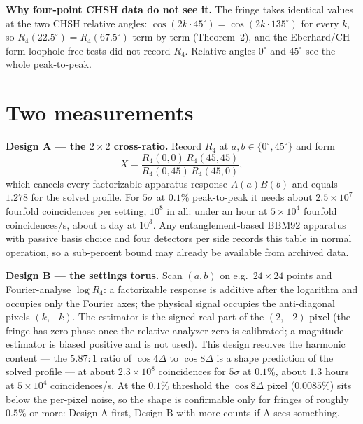 \documentclass[10pt]{article}
\begin{document}
\textbf{Why four-point CHSH data do not see it.} The fringe takes identical values at the two CHSH relative angles: $\cos(2k\cdot 45^\circ)=\cos(2k\cdot 135^\circ)$ for every $k$, so $R_4(22.5^\circ)=R_4(67.5^\circ)$ term by term (Theorem~2), and the Eberhard/CH-form loophole-free tests did not record $R_4$. Relative angles $0^\circ$ and $45^\circ$ see the whole peak-to-peak.

\section*{Two measurements}
\textbf{Design A --- the $2\times 2$ cross-ratio.} Record $R_4$ at $a,b\in\{0^\circ,45^\circ\}$ and form
\[
X=\frac{R_4(0,0)\,R_4(45,45)}{R_4(0,45)\,R_4(45,0)},
\]
which cancels every factorizable apparatus response $A(a)B(b)$ and equals $1.278$ for the solved profile. For $5\sigma$ at $0.1\%$ peak-to-peak it needs about $2.5\times 10^7$ fourfold coincidences per setting, $10^8$ in all: under an hour at $5\times 10^4$ fourfold coincidences/s, about a day at $10^3$. Any entanglement-based BBM92 apparatus with passive basis choice and four detectors per side records this table in normal operation, so a sub-percent bound may already be available from archived data.

\textbf{Design B --- the settings torus.} Scan $(a,b)$ on e.g.\ $24\times 24$ points and Fourier-analyse $\log R_4$: a factorizable response is additive after the logarithm and occupies only the Fourier axes; the physical signal occupies the anti-diagonal pixels $(k,-k)$. The estimator is the signed real part of the $(2,-2)$ pixel (the fringe has zero phase once the relative analyzer zero is calibrated; a magnitude estimator is biased positive and is not used). This design resolves the harmonic content --- the $5.87{:}1$ ratio of $\cos 4\Delta$ to $\cos 8\Delta$ is a shape prediction of the solved profile --- at about $2.3\times 10^8$ coincidences for $5\sigma$ at $0.1\%$, about $1.3$ hours at $5\times 10^4$ coincidences/s. At the $0.1\%$ threshold the $\cos 8\Delta$ pixel ($0.0085\%$) sits below the per-pixel noise, so the shape is confirmable only for fringes of roughly $0.5\%$ or more: Design A first, Design B with more counts if A sees something.
\end{document}
